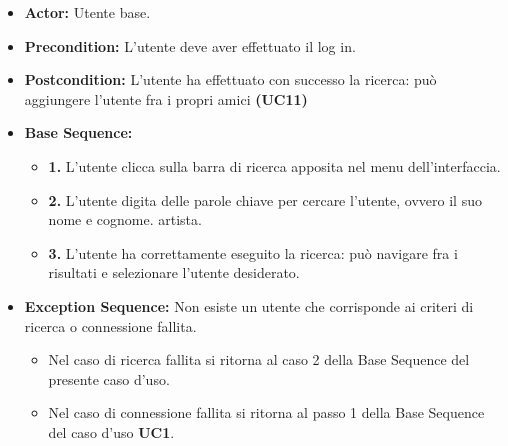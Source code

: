 \begin{itemize}
    \item \textbf{Actor:} Utente base.
    \item \textbf{Precondition:} L'utente deve aver effettuato il log in.
    \item \textbf{Postcondition:} L'utente ha effettuato con successo la ricerca: può aggiungere l'utente fra i propri amici \textbf{(UC11)}
    \item \textbf{Base Sequence:}
    \begin{itemize}
        \item \textbf{1.} L'utente clicca sulla barra di ricerca apposita nel menu dell'interfaccia.
        \item \textbf{2.} L'utente digita delle parole chiave per cercare l'utente, ovvero il suo nome e cognome.
        artista.
        \item \textbf{3.} L'utente ha correttamente eseguito la ricerca: può navigare fra i risultati e selezionare l'utente desiderato.
    \end{itemize}
    \item \textbf{Exception Sequence:} Non esiste un utente che corrisponde ai criteri di ricerca o connessione fallita.
    \begin{itemize}
        \item Nel caso di ricerca fallita si ritorna al caso 2 della Base Sequence del presente caso d'uso.
        \item Nel caso di connessione fallita si ritorna al passo 1 della Base Sequence del caso d'uso \textbf{UC1}.
    \end{itemize}
\end{itemize}
\vspace{1cm}


